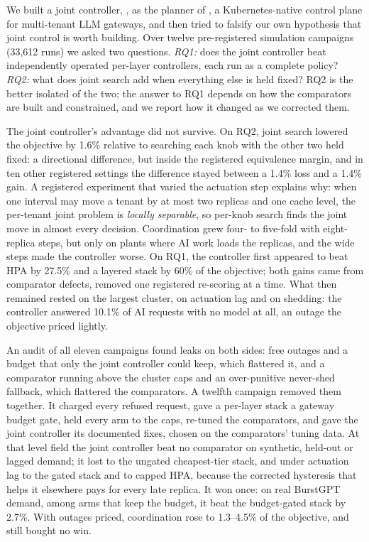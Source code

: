 We built a joint controller, \jcacintro{}, as the planner of \polyforge{},
a Kubernetes-native control plane for multi-tenant LLM gateways, and then
tried to falsify our own hypothesis that joint control is worth building.
Over twelve pre-registered simulation campaigns (33{,}612 runs) we asked
two questions. \emph{RQ1:} does the joint controller beat independently
operated per-layer controllers, each run as a complete policy?
\emph{RQ2:} what does joint search add when everything else is held
fixed? RQ2 is the better isolated of the two; the answer to RQ1 depends on
how the comparators are built and constrained, and we report how it
changed as we corrected them.

The joint controller's advantage did not survive. On RQ2, joint search
lowered the objective by 1.6\% relative to searching each knob with the
other two held fixed: a directional difference, but inside the registered
equivalence margin, and in ten other registered settings the difference
stayed between a 1.4\% loss and a 1.4\% gain. A registered experiment that
varied the actuation step explains why: when one interval may move a
tenant by at most two replicas and one cache level, the per-tenant joint
problem is \emph{locally separable}, so per-knob search finds the joint
move in almost every decision. Coordination grew four- to five-fold with
eight-replica steps, but only on plants where AI work loads the replicas,
and the wide steps made the controller worse. On RQ1, the controller first
appeared to beat HPA by 27.5\% and a layered stack by 60\% of the
objective; both gains came from comparator defects, removed one registered
re-scoring at a time. What then remained rested on the largest cluster, on
actuation lag and on shedding: the controller answered 10.1\% of AI requests
with no model at all, an outage the objective priced lightly.

An audit of all eleven campaigns found leaks on both sides: free outages and
a budget that only the joint controller could keep, which flattered it, and
a comparator running above the cluster caps and an over-punitive never-shed
fallback, which flattered the comparators. A twelfth campaign removed them
together. It charged every refused request, gave a per-layer stack a gateway
budget gate, held every arm to the caps, re-tuned the comparators, and gave
the joint controller its documented fixes, chosen on the comparators' tuning
data. At that level field the joint controller beat no comparator on
synthetic, held-out or lagged demand; it lost to the ungated cheapest-tier
stack, and under actuation lag to the gated stack and to capped HPA, because
the corrected hysteresis that helps it elsewhere pays for every late replica.
It won once: on real BurstGPT demand, among arms that keep the budget, it beat
the budget-gated stack by 2.7\%. With outages priced, coordination rose to
1.3--4.5\% of the objective, and still bought no win.

